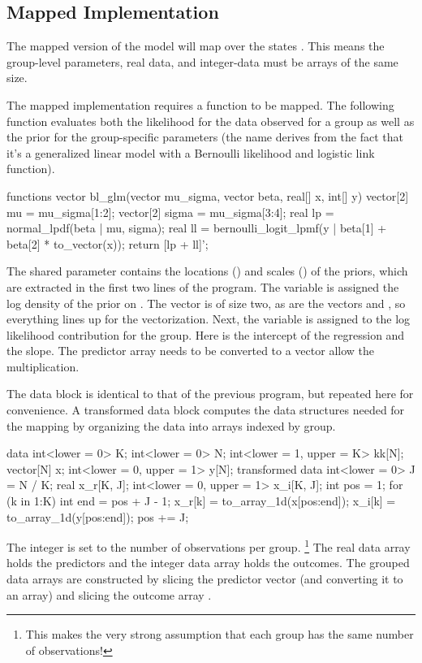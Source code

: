 \subsection{Mapped Implementation}

The mapped version of the model will map over the states .
This means the group-level parameters, real data, and integer-data
must be arrays of the same size.

The mapped implementation requires a function to be mapped.  The
following function evaluates both the likelihood for the data observed
for a group as well as the prior for the group-specific parameters
(the name  derives from the fact that it's a generalized
linear model with a Bernoulli likelihood and logistic link function).
%
\begin{stancode}
functions {
 vector bl_glm(vector mu_sigma, vector beta,
               real[] x, int[] y) {
   vector[2] mu = mu_sigma[1:2];
   vector[2] sigma = mu_sigma[3:4];
   real lp = normal_lpdf(beta | mu, sigma);
   real ll = bernoulli_logit_lpmf(y | beta[1] + beta[2] * to_vector(x));
   return [lp + ll]';
 }
}
\end{stancode}
%
The shared parameter  contains the locations
() and scales () of the
priors, which are extracted in the first two lines of the program.
The variable  is assigned the log density of the prior on
.  The vector  is of size two, as are the
vectors  and , so everything lines up for the
vectorization.  Next, the variable  is assigned to the log
likelihood contribution for the group.  Here  is the
intercept of the regression and  the slope.  The
predictor array  needs to be converted to a vector allow the
multiplication.

The data block is identical to that of the previous program, but
repeated here for convenience.  A transformed data block computes the
data structures needed for the mapping by organizing the data into
arrays indexed by group.
%
\begin{stancode}
data {
  int<lower = 0> K;
  int<lower = 0> N;
  int<lower = 1, upper = K> kk[N];
  vector[N] x;
  int<lower = 0, upper = 1> y[N];
}
transformed data {
  int<lower = 0> J = N / K;
  real x_r[K, J];
  int<lower = 0, upper = 1> x_i[K, J];
  {
    int pos = 1;
    for (k in 1:K) {
      int end = pos + J - 1;
      x_r[k] = to_array_1d(x[pos:end]);
      x_i[k] = to_array_1d(y[pos:end]);
      pos += J;
    }
  }
}
\end{stancode}
%
The integer  is set to the number of observations per group.%
%
\footnote{This makes the very strong assumption that each group has
  the same number of observations!}
%
The real data array  holds the predictors and the integer
data array  holds the outcomes.  The grouped data arrays
are constructed by slicing the predictor vector  (and
converting it to an array) and slicing the outcome array .

